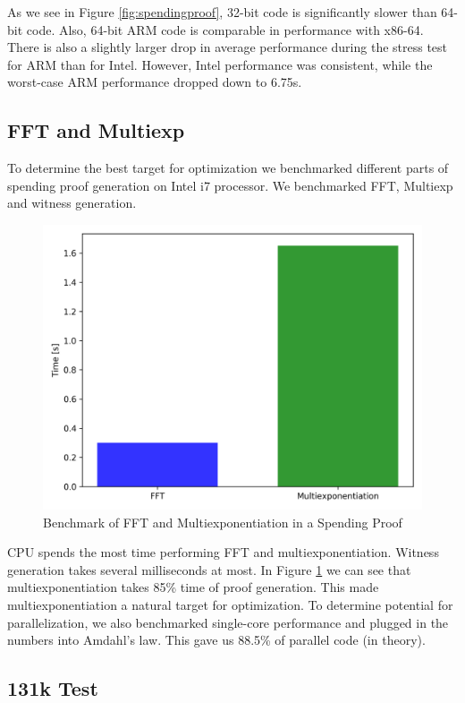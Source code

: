 \noindent As we see in Figure \ref{fig:spendingproof}, 32-bit code is significantly slower than 64-bit code. Also, 64-bit ARM code is comparable in performance with x86-64. There is also a slightly larger drop in average performance during the stress test for ARM than for Intel. However, Intel performance was consistent, while the worst-case ARM performance dropped down to 6.75s.

\subsection{FFT and Multiexp}

To determine the best target for optimization we benchmarked different parts of spending proof generation on Intel i7 processor. We benchmarked FFT, Multiexp and witness generation.

\begin{figure}[h]
    \centering
    \includegraphics[width=.75\linewidth]{Figures/proofparts.png}
    \caption{Benchmark of FFT and Multiexponentiation in a Spending Proof}
    \label{fig:partsbenchmark}
\end{figure}

\noindent CPU spends the most time performing FFT and multiexponentiation. Witness generation takes several milliseconds at most. In Figure \ref{fig:partsbenchmark} we can see that multiexponentiation takes 85\% time of proof generation. This made multiexponentiation a natural target for optimization. To determine potential for parallelization, we also benchmarked single-core performance and plugged in the numbers into Amdahl's law. This gave us 88.5\% of parallel code (in theory).\\

\subsection{131k Test}


